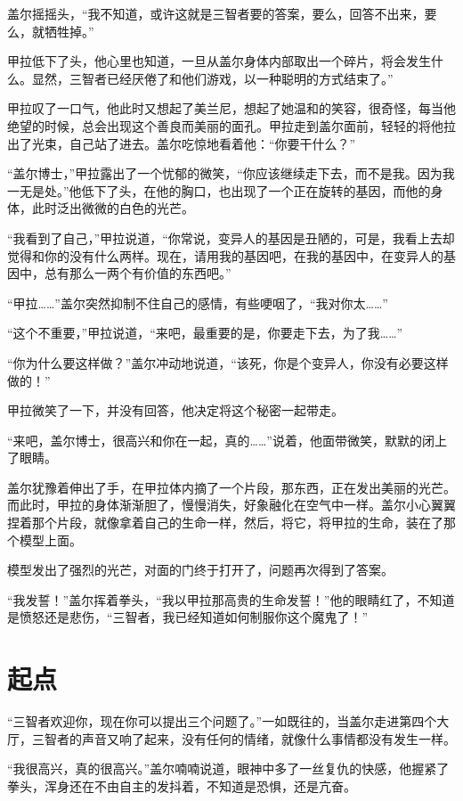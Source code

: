 盖尔摇摇头，“我不知道，或许这就是三智者要的答案，要么，回答不出来，要么，就牺牲掉。” 

甲拉低下了头，他心里也知道，一旦从盖尔身体内部取出一个碎片，将会发生什么。显然，三智者已经厌倦了和他们游戏，以一种聪明的方式结束了。” 

甲拉叹了一口气，他此时又想起了美兰尼，想起了她温和的笑容，很奇怪，每当他绝望的时候，总会出现这个善良而美丽的面孔。甲拉走到盖尔面前，轻轻的将他拉出了光束，自己站了进去。盖尔吃惊地看着他：“你要干什么？” 

“盖尔博士，”甲拉露出了一个忧郁的微笑，“你应该继续走下去，而不是我。因为我一无是处。”他低下了头，在他的胸口，也出现了一个正在旋转的基因，而他的身体，此时泛出微微的白色的光芒。 

“我看到了自己，”甲拉说道，“你常说，变异人的基因是丑陋的，可是，我看上去却觉得和你的没有什么两样。现在，请用我的基因吧，在我的基因中，在变异人的基因中，总有那么一两个有价值的东西吧。” 

“甲拉……”盖尔突然抑制不住自己的感情，有些哽咽了，“我对你太……” 

“这个不重要，”甲拉说道，“来吧，最重要的是，你要走下去，为了我……” 

“你为什么要这样做？”盖尔冲动地说道，“该死，你是个变异人，你没有必要这样做的！” 

甲拉微笑了一下，并没有回答，他决定将这个秘密一起带走。 

“来吧，盖尔博士，很高兴和你在一起，真的……”说着，他面带微笑，默默的闭上了眼睛。 

盖尔犹豫着伸出了手，在甲拉体内摘了一个片段，那东西，正在发出美丽的光芒。而此时，甲拉的身体渐渐胆了，慢慢消失，好象融化在空气中一样。盖尔小心翼翼捏着那个片段，就像拿着自己的生命一样，然后，将它，将甲拉的生命，装在了那个模型上面。 

模型发出了强烈的光芒，对面的门终于打开了，问题再次得到了答案。 

“我发誓！”盖尔挥着拳头，“我以甲拉那高贵的生命发誓！”他的眼睛红了，不知道是愤怒还是悲伤，“三智者，我已经知道如何制服你这个魔鬼了！”

\chapter{起点}

“三智者欢迎你，现在你可以提出三个问题了。”一如既往的，当盖尔走进第四个大厅，三智者的声音又响了起来，没有任何的情绪，就像什么事情都没有发生一样。 

“我很高兴，真的很高兴。”盖尔喃喃说道，眼神中多了一丝复仇的快感，他握紧了拳头，浑身还在不由自主的发抖着，不知道是恐惧，还是亢奋。 

